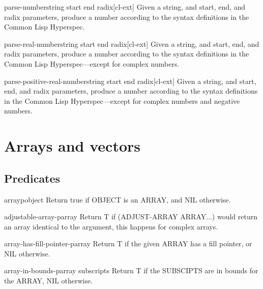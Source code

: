 \documentclass[10pt,english]{book}
\begin{document}
\begin{function}{parse-number}{string \key start end radix}[cl-ext]
  Given a string, and start, end, and radix parameters, produce a
  number according to the syntax definitions in the Common Lisp
  Hyperspec.  
\end{function}

\begin{function}{parse-real-number}{string \key start end radix}[cl-ext]
  Given a string, and start, end, and radix parameters, produce a
  number according to the syntax definitions in the Common Lisp
  Hyperspec---except for complex numbers.
\end{function}

\begin{function}{parse-positive-real-number}{string \key start end radix}[cl-ext]
  Given a string, and start, end, and radix parameters, produce a
  number according to the syntax definitions in the Common Lisp
  Hyperspec---except for complex numbers and negative numbers.
\end{function}


\chapter{Arrays and vectors}
\label{cha:arrays}

\section{Predicates}
\label{sec:array-predicates}

\begin{function}{arrayp}{object}
  Return true if OBJECT is an ARRAY, and NIL otherwise.
\end{function}

\begin{function}{adjustable-array-p}{array}
  Return T if (ADJUST-ARRAY ARRAY...) would return an array identical
   to the argument, this happens for complex arrays.
\end{function}

\begin{function}{array-has-fill-pointer-p}{array}
  Return T if the given ARRAY has a fill pointer, or NIL otherwise.
\end{function}

\begin{function}{array-in-bounds-p}{array \rest subscripts}
  Return T if the SUBSCIPTS are in bounds for the ARRAY, NIL otherwise.
\end{function}
\end{document}
